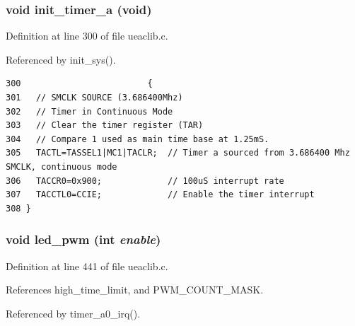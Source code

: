 \subsubsection{\setlength{\rightskip}{0pt plus 5cm}void init\_\-timer\_\-a (void)}\label{ueaclib_8c_a6}




Definition at line 300 of file ueaclib.c.

Referenced by init\_\-sys().

\footnotesize\begin{verbatim}300                         {
301   // SMCLK SOURCE (3.686400Mhz)
302   // Timer in Continuous Mode 
303   // Clear the timer register (TAR)
304   // Compare 1 used as main time base at 1.25mS. 
305   TACTL=TASSEL1|MC1|TACLR;  // Timer a sourced from 3.686400 Mhz SMCLK, continuous mode
306   TACCR0=0x900;             // 100uS interrupt rate
307   TACCTL0=CCIE;             // Enable the timer interrupt
308 }
\end{verbatim}\normalsize 


\subsubsection{\setlength{\rightskip}{0pt plus 5cm}void led\_\-pwm (int {\em enable})}\label{ueaclib_8c_a22}




Definition at line 441 of file ueaclib.c.

References high\_\-time\_\-limit, and PWM\_\-COUNT\_\-MASK.

Referenced by timer\_\-a0\_\-irq().

